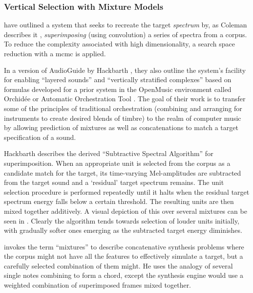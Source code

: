 \subsubsection{Vertical Selection with Mixture Models}

\cite{Hoffman2009} have outlined a system that seeks to recreate the target \textit{spectrum} by, as Coleman describes it \citeyearpar{Coleman2010}, \textit{superimposing} (using convolution) a series of spectra from a corpus. To reduce the complexity associated with high dimensionality, a search space reduction with a \acrfull{mcmc} is applied. 

In a version of AudioGuide by Hackbarth \citep{Hackbarth2013}, they also outline the system's facility for enabling ``layered sounds'' and ``vertically stratified complexes'' based on formulas \citep{Tardieu2008}  developed for a prior system in the OpenMusic environment called Orchidée or Automatic Orchestration Tool \citep{Carpentier2010}. The goal of their work is to transfer some of the principles of traditional orchestration (combining and arranging for instruments to create desired blends of timbre) to the realm of computer music by allowing prediction of mixtures as well as concatenations to match a target specification of a sound.

Hackbarth \citep{Hackbarth2010} describes the derived ``Subtractive Spectral Algorithm'' for superimposition. When an appropriate unit is selected from the corpus as a candidate match for the target, its time-varying Mel-amplitudes are subtracted from  the target sound and a `residual' target spectrum remains. The unit selection procedure is performed repeatedly until it halts when the residual target spectrum energy falls below a certain threshold. The resulting units are then mixed together additively. A visual depiction of this over several mixtures can be seen in . Clearly the algorithm tends towards selection of louder units initially, with gradually softer ones emerging as the subtracted target energy diminishes. 

\cite{Coleman2015} invokes the term ``mixtures'' to describe concatenative synthesis problems where the corpus might not have all the features to effectively simulate a target, but a carefully selected combination of them might. He uses the analogy of several single notes combining to form a chord, except the synthesis engine would use a weighted combination of superimposed frames mixed together.

